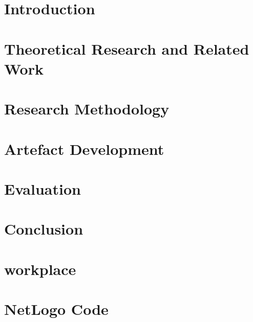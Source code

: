 \documentclass[12pt]{report}
\begin{document}

\pagestyle{fancy}
\rfoot{\thepage}
\cfoot{}






\newpage
\tableofcontents
\listoffigures
\listoftables
\clearpage


\pagestyle{plain}

\chapter{Introduction}
\label{sec:intro}


\chapter{Theoretical Research and Related Work}
\label{sec:relatedwork}


\chapter{Research Methodology}
\label{sec:methods}


\chapter{Artefact Development}
\label{sec:implementation}


\chapter{Evaluation}
\label{sec:experiments}


\chapter{Conclusion}
\label{sec:conclusion}


\chapter{workplace}
\label{sec:workplace}


\newpage




\newpage

\appendix
{}
\chapter{NetLogo Code}
\label{sec:appendix-netlogo}


\end{document}
